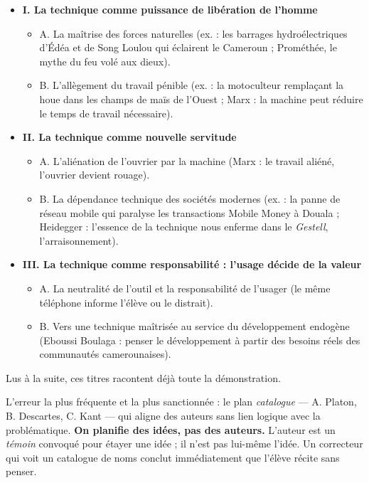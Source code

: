 \documentclass[11pt]{article}
\begin{document}
\begin{exemplebox}
\begin{itemize}
\item \textbf{I. La technique comme puissance de libération de l'homme}
\begin{itemize}
\item A. La maîtrise des forces naturelles (ex. : les barrages hydroélectriques d'Édéa et de Song Loulou qui éclairent le Cameroun ; Prométhée, le mythe du feu volé aux dieux).
\item B. L'allègement du travail pénible (ex. : la motoculteur remplaçant la houe dans les champs de maïs de l'Ouest ; Marx : la machine peut réduire le temps de travail nécessaire).
\end{itemize}
\item \textbf{II. La technique comme nouvelle servitude}
\begin{itemize}
\item A. L'aliénation de l'ouvrier par la machine (Marx : le travail aliéné, l'ouvrier devient rouage).
\item B. La dépendance technique des sociétés modernes (ex. : la panne de réseau mobile qui paralyse les transactions Mobile Money à Douala ; Heidegger : l'essence de la technique nous enferme dans le \emph{Gestell}, l'arraisonnement).
\end{itemize}
\item \textbf{III. La technique comme responsabilité : l'usage décide de la valeur}
\begin{itemize}
\item A. La neutralité de l'outil et la responsabilité de l'usager (le même téléphone informe l'élève ou le distrait).
\item B. Vers une technique maîtrisée au service du développement endogène (Eboussi Boulaga : penser le développement à partir des besoins réels des communautés camerounaises).
\end{itemize}
\end{itemize}
Lus à la suite, ces titres racontent déjà toute la démonstration.
\end{exemplebox}

\begin{attention}
L'erreur la plus fréquente et la plus sanctionnée : le plan \emph{catalogue} — A. Platon, B. Descartes, C. Kant — qui aligne des auteurs sans lien logique avec la problématique. \textbf{On planifie des idées, pas des auteurs.} L'auteur est un \emph{témoin} convoqué pour étayer une idée ; il n'est pas lui-même l'idée. Un correcteur qui voit un catalogue de noms conclut immédiatement que l'élève récite sans penser.
\end{attention}
\end{document}
